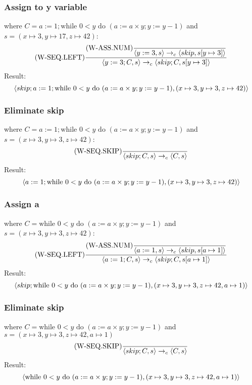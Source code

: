 \documentclass{report}
\begin{document}
            \subsubsection*{Assign to y variable}
                where $C = a:= 1;\text{while }0<y \text{ do } (a:= a \times y; y:= y - 1)$ and $s = (x \mapsto 3, y \mapsto 17, z \mapsto 42)$:
                \[\text{(W-SEQ.LEFT)}\dfrac{
                    \text{(W-ASS.NUM)}\dfrac{}{\langle y:=3, s \rangle \to_c \langle skip, s[y \mapsto 3] \rangle}
                }{\langle y:= 3; C, s \rangle \to_c \langle skip;C, s[y \mapsto 3] \rangle}\]
                Result:
                \[\langle skip; a:= 1;\text{while }0<y \text{ do } (a:= a \times y; y:= y - 1), (x \mapsto 3, y \mapsto 3, z \mapsto 42) \rangle\]
            \subsubsection*{Eliminate skip}
                where $C = a:= 1;\text{while }0<y \text{ do } (a:= a \times y; y:= y - 1)$ and $s = (x \mapsto 3, y \mapsto 3, z \mapsto 42)$:
                \[\text{(W-SEQ.SKIP)}\dfrac{}{\langle skip;C, s \rangle \to_c \langle C, s \rangle}\]
                Result:
                \[\langle a:= 1;\text{while }0<y \text{ do } (a:= a \times y; y:= y - 1), (x \mapsto 3, y \mapsto 3, z \mapsto 42) \rangle\]
            \subsubsection*{Assign a}
                where $C = \text{while }0<y \text{ do } (a:= a \times y; y:= y - 1)$ and $s = (x \mapsto 3, y \mapsto 3, z \mapsto 42)$:
                \[\text{(W-SEQ.LEFT)}\dfrac{
                    \text{(W-ASS.NUM)}\dfrac{}{\langle a := 1, s \rangle \to_c \langle skip, s[a \mapsto 1] \rangle}
                }{\langle a:=1;C, s \rangle \to_c \langle skip;C, s[a \mapsto 1] \rangle}\]
                Result:
                \[\langle skip;\text{while }0<y \text{ do } (a:= a \times y; y:= y - 1), (x \mapsto 3, y \mapsto 3, z \mapsto 42, a \mapsto 1) \rangle\]
            \subsubsection*{Eliminate skip}
                where $C = \text{while }0<y \text{ do } (a:= a \times y; y:= y - 1)$ and $s = (x \mapsto 3, y \mapsto 3, z \mapsto 42, a \mapsto 1)$
                \[\text{(W-SEQ.SKIP)}\dfrac{}{\langle skip;C, s \rangle \to_c \langle C, s \rangle}\]
                Result:
                \[\langle \text{while }0<y \text{ do } (a:= a \times y; y:= y - 1), (x \mapsto 3, y \mapsto 3, z \mapsto 42, a \mapsto 1) \rangle\]
\end{document}
